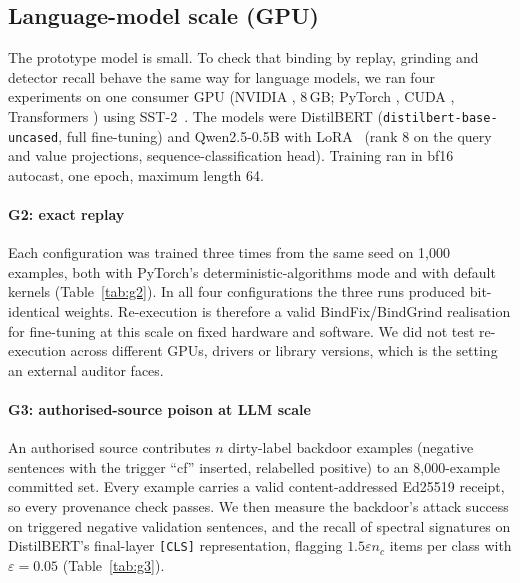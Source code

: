 \subsection{Language-model scale (GPU)}

The prototype model is small. To check that binding by replay, grinding and detector
recall behave the same way for language models, we ran four experiments on one consumer
GPU (NVIDIA \GPUname, 8\,GB; PyTorch \GPUtorch, CUDA \GPUcuda, Transformers \GPUtf) using
SST-2~\cite{socher2013sst}. The models were DistilBERT (\texttt{distilbert-base-uncased},
full fine-tuning) and Qwen2.5-0.5B with LoRA~\cite{hu2022lora} (rank 8 on the query and
value projections, sequence-classification head). Training ran in bf16 autocast, one
epoch, maximum length 64.

\paragraph{G2: exact replay}
Each configuration was trained three times from the same seed on 1,000 examples, both with
PyTorch's deterministic-algorithms mode and with default kernels (Table~\ref{tab:g2}). In
all four configurations the three runs produced bit-identical weights. Re-execution is
therefore a valid \textsf{BindFix}/\textsf{BindGrind} realisation for fine-tuning at this
scale on fixed hardware and software. We did not test re-execution across different GPUs,
drivers or library versions, which is the setting an external auditor faces.

\begin{table}[t]
\centering\scriptsize
\caption{G2: replay of fine-tuning on one GPU (3 runs per row, same seed and data).}\label{tab:g2}
\end{table}

\paragraph{G3: authorised-source poison at LLM scale}
An authorised source contributes $n$ dirty-label backdoor examples (negative sentences with
the trigger ``cf'' inserted, relabelled positive) to an 8,000-example committed set. Every
example carries a valid content-addressed Ed25519 receipt, so every provenance check
passes. We then measure the backdoor's attack success on triggered negative validation
sentences, and the recall of spectral signatures on DistilBERT's final-layer
\texttt{[CLS]} representation, flagging $1.5\varepsilon n_c$ items per class with
$\varepsilon=0.05$ (Table~\ref{tab:g3}).

